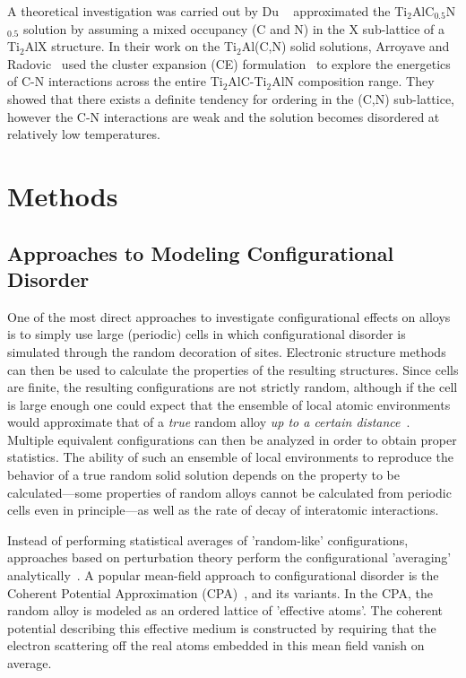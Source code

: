 \documentclass[preprint,amsmath,amssymb,aps, prb,showkeys]{revtex4-1}
\begin{document}
A theoretical investigation was carried out by Du ~\cite{du2009theoretical} approximated the Ti$_2$AlC$_{0.5}$N$_{0.5}$ solution by assuming a mixed occupancy (C and N) in the X sub-lattice of a Ti$_2$AlX structure. In their work on the Ti$_2$Al(C,N) solid solutions, Arroyave and Radovic~\cite{arroyave2011MAX} used the cluster expansion (CE) formulation~\cite{domb2000phase,de1994solid} to explore the energetics of C-N interactions across the entire Ti$_2$AlC-Ti$_2$AlN composition range. They showed that there exists a definite tendency for ordering in the (C,N) sub-lattice, however the C-N interactions are weak and the solution becomes disordered at relatively low temperatures. 
\section{Methods}
\label{sec:methods}

\subsection{Approaches to Modeling Configurational Disorder}

One of the most direct approaches to investigate configurational effects on alloys is to simply use large (periodic) cells in which configurational disorder is simulated through the random decoration of sites. Electronic structure methods~\cite{kohn1965self,vasp} can then be used to calculate the properties of the resulting structures. Since cells are finite, the resulting configurations are not strictly random, although if the cell is large enough one could expect that the ensemble of local atomic environments would approximate that of a \emph{true} random alloy \emph{up to a certain distance}~\cite{wei1990electronic}. Multiple equivalent configurations can then be analyzed in order to obtain proper statistics. The ability of such an ensemble of local environments to reproduce the behavior of a true random solid solution depends on the property to be calculated---some properties of random alloys cannot be calculated from periodic cells even in principle---as well 
as the rate of decay of interatomic interactions.

Instead of performing statistical averages of 'random-like' configurations, approaches based on perturbation theory perform the configurational 'averaging' analytically~\cite{turchi2007interface}. A popular mean-field approach to configurational disorder is the Coherent Potential Approximation  (CPA)~\cite{yonezawa1973coherent}, and its variants. In the CPA, the random alloy is modeled  as an ordered lattice of 'effective atoms'. The coherent potential describing this effective medium is constructed by requiring that the electron scattering off the real atoms embedded in this mean field vanish on average. 
\end{document}
